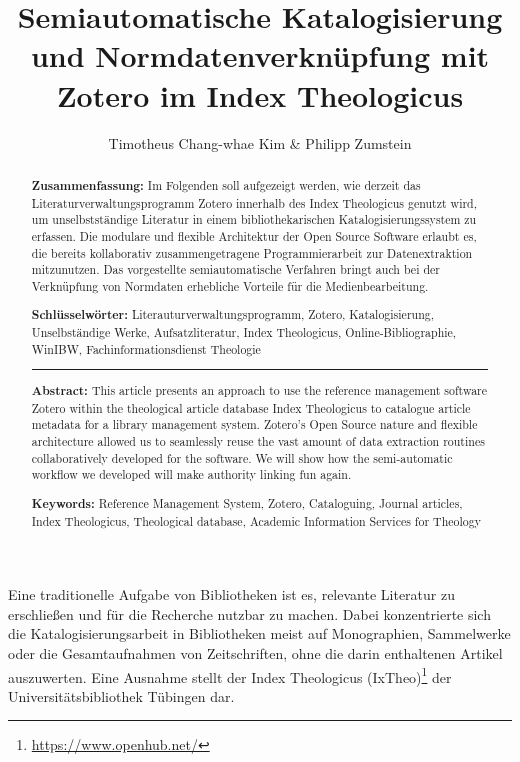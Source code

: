 \documentclass[a4paper,
fontsize=11pt,
oneside,
numbers=noperiodatend,
parskip=half-,
bibliography=totoc,
final
]{scrartcl}
\title{\LARGE{Semiautomatische Katalogisierung und Normdatenverknüpfung mit Zotero im Index Theologicus}} %
\author{Timotheus Chang-whae Kim \& Philipp Zumstein} %
\date{}
\begin{document}
\maketitle
\thispagestyle{fancyplain} 

\begin{abstract}
\small
\textbf{Zusammenfassung:} Im Folgenden soll aufgezeigt werden, wie
derzeit das Literaturverwaltungsprogramm Zotero innerhalb des Index
Theologicus genutzt wird, um unselbstständige Literatur in einem
bibliothekarischen Katalogisierungssystem zu erfassen. Die modulare und
flexible Architektur der Open Source Software erlaubt es, die bereits
kollaborativ zusammengetragene Programmierarbeit zur Datenextraktion
mitzunutzen. Das vorgestellte semiautomatische Verfahren bringt auch bei
der Verknüpfung von Normdaten erhebliche Vorteile für die
Medienbearbeitung.

\textbf{Schlüsselwörter:} Literauturverwaltungsprogramm, Zotero,
Katalogisierung, Unselbständige Werke, Aufsatzliteratur, Index
Theologicus, Online-Bibliographie, WinIBW, Fachinformationsdienst
Theologie

\begin{center}\rule{0.5\linewidth}{\linethickness}\end{center}

\textbf{Abstract:} This article presents an approach to use the
reference management software Zotero within the theological article
database Index Theologicus to catalogue article metadata for a library
management system. Zotero's Open Source nature and flexible architecture
allowed us to seamlessly reuse the vast amount of data extraction
routines collaboratively developed for the software. We will show how
the semi-automatic workflow we developed will make authority linking fun
again.

\textbf{Keywords:} Reference Management System, Zotero, Cataloguing,
Journal articles, Index Theologicus, Theological database, Academic
Information Services for Theology
\end{abstract}

Eine traditionelle Aufgabe von Bibliotheken ist es, relevante Literatur
zu erschließen und für die Recherche nutzbar zu machen. Dabei
konzentrierte sich die Katalogisierungsarbeit in Bibliotheken meist auf
Monographien, Sammelwerke oder die Gesamtaufnahmen von Zeitschriften,
ohne die darin enthaltenen Artikel auszuwerten. Eine Ausnahme stellt der
Index Theologicus (IxTheo)\footnote{\url{https://www.openhub.net/}} der
Universitätsbibliothek Tübingen dar.
\end{document}
